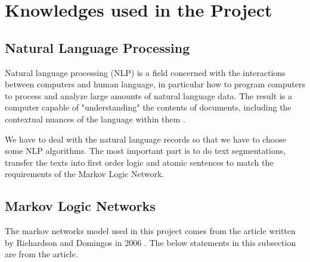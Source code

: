 \documentclass[
12pt, %
a4paper, %
oneside, %
headinclude,footinclude, %
BCOR5mm, %
]{scrartcl}
\begin{document}

\let\thefootnote\relax{}




\newpage %


\section{Knowledges used in the Project}
\subsection{Natural Language Processing}
Natural language processing (NLP) is a field concerned with the interactions between computers and human language, in particular how to program computers to process and analyze large amounts of natural language data. The result is a computer capable of "understanding" the contents of documents, including the contextual nuances of the language within them \cite{enwiki:1020063620}.

We have to deal with the natural language records so that we have to choose some NLP algorithms. The most important part is to do text segmentations, transfer the texts into first order logic and atomic sentences to match the requirements of the Markov Logic Network.

\subsection{Markov Logic Networks}
The markov networks model used in this project comes from the article written by Richardson and Domingos in 2006 \cite{richardson2006markov}. The below statements in this subsection are from the article.
\end{document}

